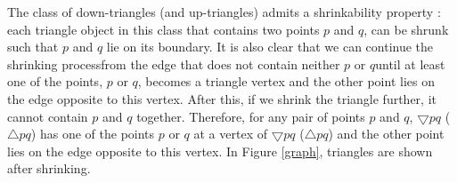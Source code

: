 The class of down-triangles (and up-triangles) admits a shrinkability property \cite{Abrego2009}: each triangle object in this class that contains two 
points $p$ and $q$, can be shrunk such that $p$ and $q$ lie on its boundary. It is also clear that we can continue the shrinking process\textemdash from 
the edge that does not contain neither $p$ or $q$\textemdash until at least one of the points, $p$ or $q$, becomes a triangle vertex and the other point 
lies on the edge opposite to this vertex. After this, if we shrink the triangle further, it cannot contain $p$ and $q$ together. Therefore, for any pair 
of points $p$ and $q$, $\bigtriangledown pq$ ($\bigtriangleup pq$) has one of the points $p$ or $q$ at a vertex of $\bigtriangledown pq$ 
($\bigtriangleup pq$) and the other point lies on the edge opposite to this vertex. In Figure \ref{graph}, triangles are shown after shrinking. 


